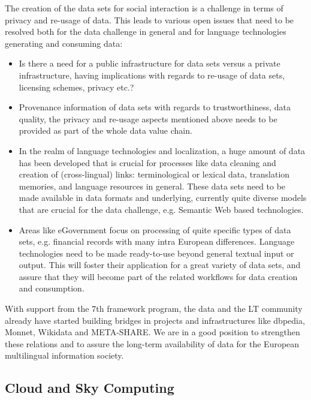 \begin{multicols}{2}
The creation of the data sets for social interaction is a challenge in terms of privacy and re-usage of data. This leads to various open issues that need to be resolved both for the data challenge in general and for language technologies generating and consuming data:

\begin{itemize}
\item Is there a need for a public infrastructure for data sets versus a private infrastructure, having implications with regards to re-usage of data sets, licensing schemes, privacy etc.?
\item Provenance information of data sets with regards to trustworthiness, data quality, the privacy and re-usage aspects mentioned above needs to be provided as part of the whole data value chain.
\item In the realm of language technologies and localization, a huge amount of data has been developed that is crucial for processes like data cleaning and creation of (cross-lingual) links: terminological or lexical data, translation memories, and language resources in general. These data sets need to be made available in data formats and underlying, currently quite diverse models that are crucial for the data challenge, e.g. Semantic Web based technologies.
\item Areas like eGovernment focus on processing of quite specific types of data sets, e.g. financial records with many intra European differences. Language technologies need to be made ready-to-use beyond general textual input or output. This will foster their application for a great variety of data sets, and assure that they will become part of the related workflows for data creation and consumption.
\end{itemize}

With support from the 7th framework program, the data and the LT community already have started building bridges in projects and infrastructures like dbpedia, Monnet, Wikidata and META-SHARE. We are in a good position to strengthen these relations and to assure the long-term availability of data for the European multilingual information society.

\subsection{Cloud and Sky Computing}
\label{sec:cloud-sky-computing}


\end{multicols}
